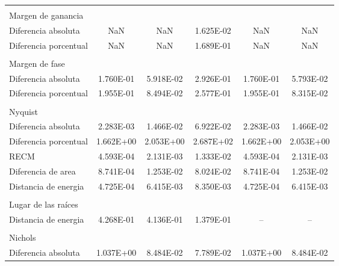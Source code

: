 {\begin{longtable}{l @{\extracolsep{\fill}} ccccc}
            & & & & & \\
            Margen de ganancia     &  &  &  &  & \\ \cmidrule{1-1}
            Diferencia absoluta    &        NaN      &       NaN       & \num{1.625E-02} &       NaN       &        NaN       \\
            Diferencia porcentual  &        NaN      &       NaN       & \num{1.689E-01} &       NaN       &        NaN       \\
            & & & & & \\
            Margen de fase         &  &  &  &  & \\ \cmidrule{1-1}
            Diferencia absoluta    & \num{1.760E-01} & \num{5.918E-02} & \num{2.926E-01} & \num{1.760E-01} & \num{5.793E-02}  \\
            Diferencia porcentual  & \num{1.955E-01} & \num{8.494E-02} & \num{2.577E-01} & \num{1.955E-01} & \num{8.315E-02}  \\
            & & & & & \\
            Nyquist                &  &  &  &  & \\ \cmidrule{1-1}
            Diferencia absoluta    & \num{2.283E-03} & \num{1.466E-02} & \num{6.922E-02} & \num{2.283E-03} & \num{1.466E-02}  \\
            Diferencia porcentual  & \num{1.662E+00} & \num{2.053E+00} & \num{2.687E+02} & \num{1.662E+00} & \num{2.053E+00}  \\
            RECM                   & \num{4.593E-04} & \num{2.131E-03} & \num{1.333E-02} & \num{4.593E-04} & \num{2.131E-03}  \\
            Diferencia de area     & \num{8.741E-04} & \num{1.253E-02} & \num{8.024E-02} & \num{8.741E-04} & \num{1.253E-02}  \\
            Distancia de energia   & \num{4.725E-04} & \num{6.415E-03} & \num{8.350E-03} & \num{4.725E-04} & \num{6.415E-03}  \\
            & & & & & \\
            Lugar de las raíces    &  &  &  &  & \\ \cmidrule{1-1}
            Distancia de energia   & \num{4.268E-01} & \num{4.136E-01} & \num{1.379E-01} & -- & --  \\
            & & & & & \\
            Nichols                &  &  &  &  & \\ \cmidrule{1-1}
            Diferencia absoluta    & \num{1.037E+00} & \num{8.484E-02} & \num{7.789E-02} & \num{1.037E+00} & \num{8.484E-02}  \\

\end{longtable}}
